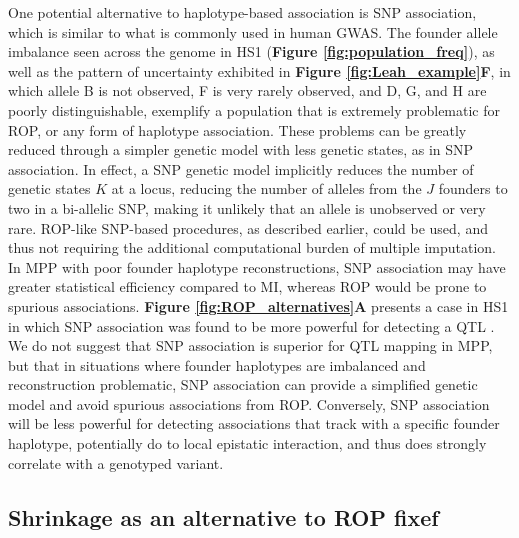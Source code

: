 One potential alternative to haplotype-based association is SNP association, which is similar to what is commonly used in human GWAS. The founder allele imbalance seen across the genome in HS1 (\textbf{Figure \ref{fig:population_freq}}), as well as the pattern of uncertainty exhibited in \textbf{Figure \ref{fig:Leah_example}F}, in which allele B is not observed, F is very rarely observed, and D, G, and H are poorly distinguishable, exemplify a population that is extremely problematic for ROP, or any form of haplotype association. These problems can be greatly reduced through a simpler genetic model with less genetic states, as in SNP association.  
In effect, a SNP genetic model implicitly reduces the number of genetic states $K$ at a locus, reducing the number of alleles from the $J$ founders to two in a bi-allelic SNP, making it unlikely that an allele is unobserved or very rare. ROP-like SNP-based procedures, as described earlier, could be used, and thus not requiring the additional computational burden of multiple imputation. In MPP with poor founder haplotype reconstructions, SNP association may have greater statistical efficiency compared to MI, whereas ROP would be prone to spurious associations. \textbf{Figure \ref{fig:ROP_alternatives}A} presents a case in HS1 in which SNP association was found to be more powerful for detecting a QTL \citep{Keele2017}. We do not suggest that SNP association is superior for QTL mapping in MPP, but that in situations where founder haplotypes are imbalanced and reconstruction problematic, SNP association can provide a simplified genetic model and avoid spurious associations from ROP. Conversely, SNP association will be less powerful for detecting associations that track with a specific founder haplotype, potentially do to local epistatic interaction, and thus does strongly correlate with a genotyped variant.

\subsection{Shrinkage as an alternative to ROP fixef}

